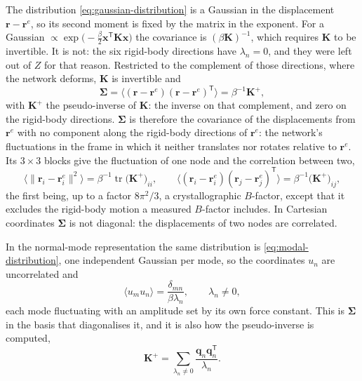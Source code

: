 \documentclass[11pt]{article}
\newcommand{\rr}{\mathbf{r}}
\newcommand{\KK}{\mathbf{K}}
\newcommand{\re}{\rr^{e}}
\begin{document}
The distribution \eqref{eq:gaussian-distribution} is a Gaussian in the displacement $\rr - \re$, so its second moment is fixed by the matrix in the exponent.
For a Gaussian $\propto \exp\big(-\tfrac{\beta}{2}\mathbf{x}^{\mathsf T}\KK\mathbf{x}\big)$ the covariance is $(\beta\KK)^{-1}$, which requires $\KK$ to be invertible.
It is not: the six rigid-body directions have $\lambda_n = 0$, and they were left out of $Z$ for that reason.
Restricted to the complement of those directions, where the network deforms, $\KK$ is invertible and
\begin{equation}
\boxed{
\bm{\Sigma} = \big\langle (\rr - \re)(\rr - \re)^{\mathsf T} \big\rangle
= \beta^{-1}\KK^{+},
}
\label{eq:covariance}
\end{equation}
with $\KK^{+}$ the pseudo-inverse of $\KK$: the inverse on that complement, and zero on the rigid-body directions.
$\bm{\Sigma}$ is therefore the covariance of the displacements from $\re$ with no component along the rigid-body directions of $\re$: the network's fluctuations in the frame in which it neither translates nor rotates relative to $\re$.
Its $3\times3$ blocks give the fluctuation of one node and the correlation between two,
\begin{equation}
\big\langle \lVert \rr_i - \re_i \rVert^{2} \big\rangle
= \beta^{-1} \operatorname{tr} \big(\KK^{+}\big)_{ii},
\qquad
\big\langle (\rr_i - \re_i)(\rr_j - \re_j)^{\mathsf T} \big\rangle
= \beta^{-1} \big(\KK^{+}\big)_{ij},
\label{eq:node-fluctuation}
\end{equation}
the first being, up to a factor $8\pi^{2}/3$, a crystallographic $B$-factor, except that it excludes the rigid-body motion a measured $B$-factor includes.
In Cartesian coordinates $\bm{\Sigma}$ is not diagonal: the displacements of two nodes are correlated.

In the normal-mode representation the same distribution is \eqref{eq:modal-distribution}, one independent Gaussian per mode, so the coordinates $u_n$ are uncorrelated and
\begin{equation}
\boxed{
\langle u_m u_n \rangle = \frac{\delta_{mn}}{\beta\lambda_n},
\qquad \lambda_n \ne 0 ,
}
\label{eq:modal-covariance}
\end{equation}
each mode fluctuating with an amplitude set by its own force constant.
This is $\bm{\Sigma}$ in the basis that diagonalises it, and it is also how the pseudo-inverse is computed,
\begin{equation}
\KK^{+} = \sum_{\lambda_n \ne 0} \frac{\mathbf{q}_n \mathbf{q}_n^{\mathsf T}}{\lambda_n}.
\label{eq:pseudo-inverse}
\end{equation}
\end{document}
